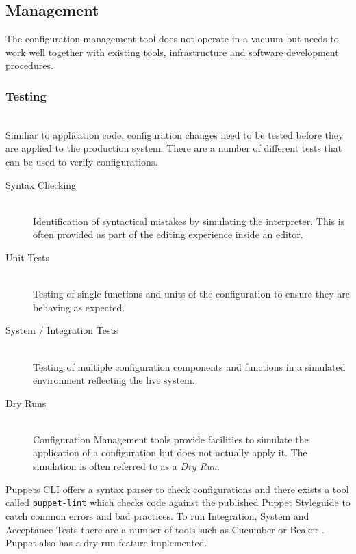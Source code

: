 \subsection{Management}

The configuration management tool does not operate in a vacuum but needs to work well together with existing tools, infrastructure and software development procedures.

\subsubsection{Testing}\hfill\\
Similiar to application code, configuration changes need to be tested before they are applied to the production system. There are a number of different tests that can be used to verify configurations.

\begin{description}
	
	\item[Syntax Checking] \hfill \\ 
	Identification of syntactical mistakes by simulating the interpreter. This is often provided as part of the editing experience inside an editor.
	
	\item[Unit Tests] \hfill \\
	Testing of single functions and units of the configuration to ensure they are behaving as expected.
	
	\item[System / Integration Tests]  \hfill \\
	Testing of multiple configuration components and functions in a simulated environment reflecting the live system.
	
	\item[Dry Runs] \hfill \\
	Configuration Management tools provide facilities to simulate the application of a configuration but does not actually apply it. The simulation is often referred to as a \textit{Dry Run}.	
	
\end{description}

Puppets CLI offers a syntax parser to check configurations and there exists a tool called \texttt{puppet-lint} which checks code against the published Puppet Styleguide to catch common errors and bad practices. To run Integration, System and Acceptance Tests there are a number of tools such as Cucumber or Beaker \cite{verifypuppet}. Puppet also has a dry-run feature implemented.

